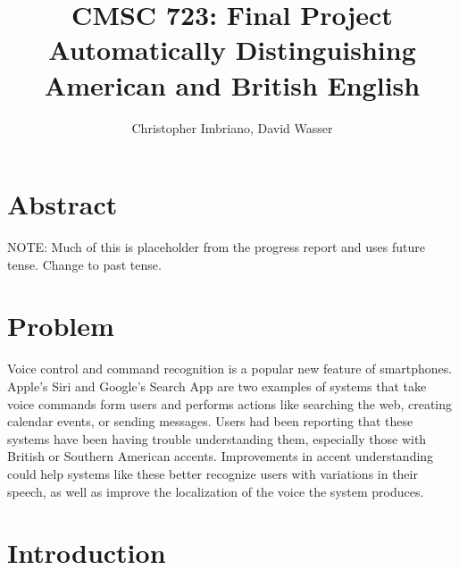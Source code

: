 \documentclass[11pt, letterpaper, oneside]{article}
\begin{document}
\title{CMSC 723: Final Project \\ Automatically Distinguishing American and British English}
\author{Christopher Imbriano, David Wasser}

\maketitle




\section{Abstract}

NOTE:  Much of this is placeholder from the progress report and uses future tense.  Change to past tense.

\section{Problem}
Voice control and command recognition is a popular new feature of smartphones. 
Apple's Siri and Google's Search App are two examples of systems that take voice commands form users and performs actions like searching the web, creating calendar events, or sending messages.
Users had been reporting that these systems have been having trouble understanding them, especially those with British or Southern American accents. 
Improvements in accent understanding could help systems like these better recognize users with variations in their speech, as well as improve the localization of the voice the system produces.

\section{Introduction}
\end{document}
